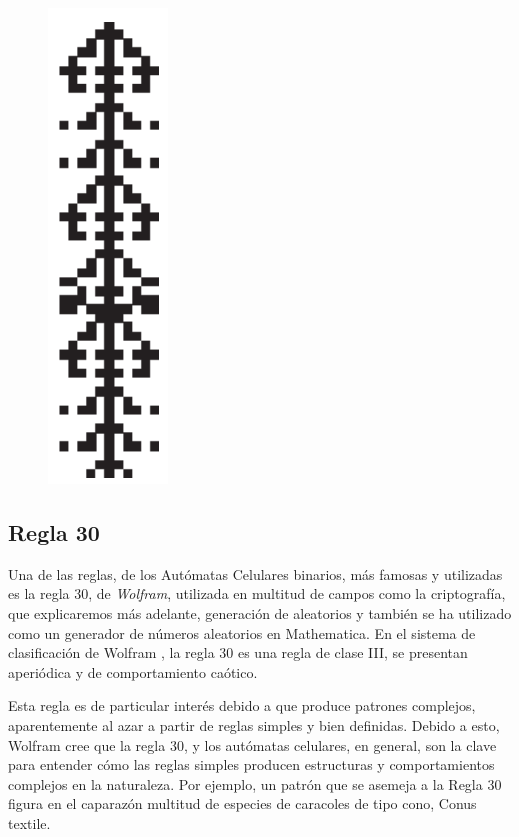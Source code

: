 \begin{figure}[H]
\centering
\includegraphics[scale=0.7]{imagenes/ejemplo_3.png}
\end{figure}


\subsection{Regla 30}
Una de las reglas, de los Autómatas Celulares binarios, más famosas y utilizadas es la regla 30, de \textit{Wolfram}, utilizada en multitud de campos como la criptografía, que explicaremos más adelante, generación de aleatorios  y también se ha utilizado como un generador de números aleatorios en Mathematica. En el  sistema de clasificación de Wolfram , la regla 30 es una regla de clase III, se presentan aperiódica y de comportamiento caótico.

Esta regla es de particular interés debido a que produce patrones complejos, aparentemente al azar a partir de reglas simples y bien definidas. Debido a esto, Wolfram cree que la regla 30, y los autómatas celulares, en general, son la clave para entender cómo las reglas simples producen estructuras y comportamientos complejos en la naturaleza. Por ejemplo, un patrón que se asemeja a la Regla 30 figura en el caparazón multitud de especies de caracoles de tipo cono, Conus textile.


